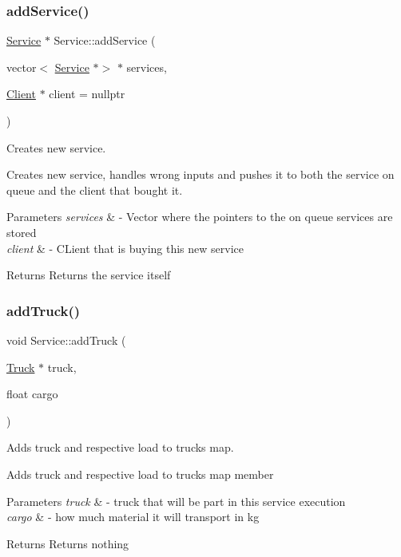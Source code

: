 \subsubsection{\texorpdfstring{add\+Service()}{addService()}}
{\footnotesize\ttfamily \hyperlink{class_service}{Service} $\ast$ Service\+::add\+Service (\begin{DoxyParamCaption}\item[{vector$<$ \hyperlink{class_service}{Service} $\ast$$>$ $\ast$}]{services,  }\item[{\hyperlink{class_client}{Client} $\ast$}]{client = {\ttfamily nullptr} }\end{DoxyParamCaption})\hspace{0.3cm}{\ttfamily [static]}}



Creates new service. 

Creates new service, handles wrong inputs and pushes it to both the service on queue and the client that bought it.


\begin{DoxyParams}{Parameters}
{\em services} & -\/ Vector where the pointers to the on queue services are stored \\
\hline
{\em client} & -\/ C\+Lient that is buying this new service \\
\hline
\end{DoxyParams}
\begin{DoxyReturn}{Returns}
Returns the service itself 
\end{DoxyReturn}
\mbox{\label{class_service_a9812c174aa203cb9e7b9f758b1815ac4}} 
\subsubsection{\texorpdfstring{add\+Truck()}{addTruck()}}
{\footnotesize\ttfamily void Service\+::add\+Truck (\begin{DoxyParamCaption}\item[{\hyperlink{class_truck}{Truck} $\ast$}]{truck,  }\item[{float}]{cargo }\end{DoxyParamCaption})}



Adds truck and respective load to trucks map. 

Adds truck and respective load to trucks map member 
\begin{DoxyParams}{Parameters}
{\em truck} & -\/ truck that will be part in this service execution \\
\hline
{\em cargo} & -\/ how much material it will transport in kg \\
\hline
\end{DoxyParams}
\begin{DoxyReturn}{Returns}
Returns nothing 
\end{DoxyReturn}
\mbox{\label{class_service_a7df62bae781cf95c63af4eea324bceed}} 
